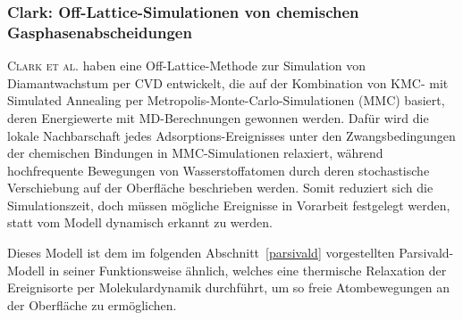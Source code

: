 \subsubsection{Clark: Off-Lattice-Simulationen von chemischen Gasphasenabscheidungen}
\textsc{Clark et al.}\cite{clark_hybrid_1996} haben eine Off-Lattice-Methode zur Simulation von Diamantwachstum per CVD entwickelt, die auf der Kombination von KMC- mit Simulated Annealing per Metropolis-Monte-Carlo-Simulationen (MMC) basiert, deren Energiewerte mit MD-Berechnungen gewonnen werden.
Dafür wird die lokale Nachbarschaft jedes Adsorptions-Ereignisses unter den Zwangsbedingungen der chemischen Bindungen in MMC-Simu\-la\-tionen relaxiert, während hochfrequente Bewegungen von Wasserstoffatomen durch deren stochastische Verschiebung auf der Oberfläche beschrieben werden.
Somit reduziert sich die Simulationszeit, doch müssen mögliche Ereignisse in Vorarbeit festgelegt werden, statt vom Modell dynamisch erkannt zu werden.


Dieses Modell ist dem im folgenden Abschnitt~\ref{parsivald} vorgestellten Parsivald-Modell in seiner Funktionsweise ähnlich, welches eine thermische Relaxation der Ereignisorte per Molekulardynamik durchführt, um so freie Atombewegungen an der Oberfläche zu ermöglichen.

